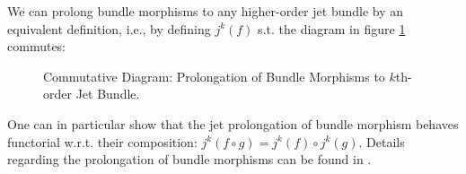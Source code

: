 We can prolong bundle morphisms to any higher-order jet bundle by an equivalent definition, i.e., by defining $j^k(f)$ s.t. the diagram in figure \ref{POrolongK} commutes:
\begin{figure}[hbt!]
\centering
{}
\caption{Commutative Diagram: Prolongation of Bundle Morphisms to $k$th-order Jet Bundle.} \label{POrolongK}
\end{figure}
One can in particular show that the jet prolongation of bundle morphism behaves functorial w.r.t. their composition: $j^k(f\circ g) = j^k(f) \circ j^k (g)$. Details regarding the prolongation of bundle morphisms can be found in \cite{saunders_1989}.

